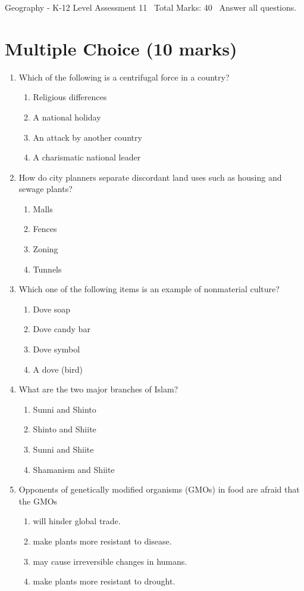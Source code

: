 \documentclass[12pt]{article}
\begin{document}
\begin{center}
Geography - K-12 Level Assessment 11 \
Total Marks: 40 \
Answer all questions.
\end{center}

\section*{Multiple Choice (10 marks)}
\begin{enumerate}[label=\arabic*.]
\item Which of the following is a centrifugal force in a country?
\begin{enumerate}[label=(\alph*)]
    \item Religious differences
    \item A national holiday
    \item An attack by another country
    \item A charismatic national leader
\end{enumerate}
\item How do city planners separate discordant land uses such as housing and sewage plants?
\begin{enumerate}[label=(\alph*)]
    \item Malls
    \item Fences
    \item Zoning
    \item Tunnels
\end{enumerate}
\item Which one of the following items is an example of nonmaterial culture?
\begin{enumerate}[label=(\alph*)]
    \item Dove soap
    \item Dove candy bar
    \item Dove symbol
    \item A dove (bird)
\end{enumerate}
\item What are the two major branches of Islam?
\begin{enumerate}[label=(\alph*)]
    \item Sunni and Shinto
    \item Shinto and Shiite
    \item Sunni and Shiite
    \item Shamanism and Shiite
\end{enumerate}
\item Opponents of genetically modified organisms (GMOs) in food are afraid that the GMOs
\begin{enumerate}[label=(\alph*)]
    \item will hinder global trade.
    \item make plants more resistant to disease.
    \item may cause irreversible changes in humans.
    \item make plants more resistant to drought.
\end{enumerate}
\end{enumerate}
\end{document}
